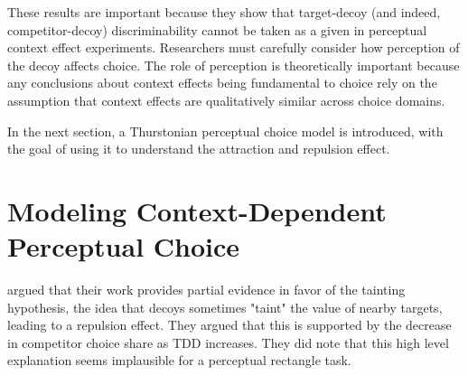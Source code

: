 



These results are important because they show that target-decoy (and indeed, competitor-decoy) discriminability cannot be taken as a given in perceptual context effect experiments. Researchers must carefully consider how perception of the decoy affects choice. The role of perception is theoretically important because any conclusions about context effects being fundamental to choice \parencite{trueblood2013not} rely on the assumption that context effects are qualitatively similar across choice domains.

In the next section, a Thurstonian perceptual choice model is introduced, with the goal of using it to understand the attraction and repulsion effect. 

\section{Modeling Context-Dependent Perceptual Choice}

\textcite{spektorWhenGoodLooks2018b} argued that their work provides partial evidence in favor of the tainting hypothesis, the idea that decoys sometimes "taint" the value of nearby targets, leading to a repulsion effect. They argued that this is supported by the decrease in competitor choice share as TDD increases. They did note that this high level explanation seems implausible for a perceptual rectangle task.


